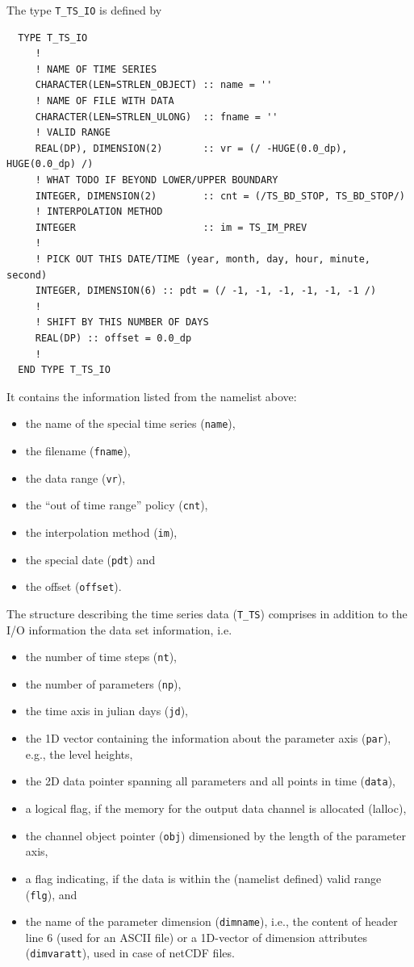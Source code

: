 \documentclass[11pt,twoside]{report}
\begin{document}
The type \verb|T_TS_IO| is defined by
\begin{verbatim}
  TYPE T_TS_IO
     !
     ! NAME OF TIME SERIES
     CHARACTER(LEN=STRLEN_OBJECT) :: name = ''
     ! NAME OF FILE WITH DATA
     CHARACTER(LEN=STRLEN_ULONG)  :: fname = ''
     ! VALID RANGE
     REAL(DP), DIMENSION(2)       :: vr = (/ -HUGE(0.0_dp), HUGE(0.0_dp) /)
     ! WHAT TODO IF BEYOND LOWER/UPPER BOUNDARY
     INTEGER, DIMENSION(2)        :: cnt = (/TS_BD_STOP, TS_BD_STOP/)
     ! INTERPOLATION METHOD
     INTEGER                      :: im = TS_IM_PREV
     !
     ! PICK OUT THIS DATE/TIME (year, month, day, hour, minute, second)
     INTEGER, DIMENSION(6) :: pdt = (/ -1, -1, -1, -1, -1, -1 /)
     !
     ! SHIFT BY THIS NUMBER OF DAYS
     REAL(DP) :: offset = 0.0_dp
     !     
  END TYPE T_TS_IO
\end{verbatim}
It contains the information listed from the namelist above: 
\begin{itemize}
\item the name of the special time series (\verb|name|), 
\item the filename (\verb|fname|), 
\item the data range (\verb|vr|), 
\item the ``out of time range'' policy (\verb|cnt|),
\item  the interpolation method (\verb|im|), 
\item the special date (\verb|pdt|) and 
\item the offset (\verb|offset|).
\end{itemize}

The structure describing the time series data (\verb|T_TS|) comprises
in addition to the I/O information the data set information, i.e. 
\begin{itemize}
\item the number of time steps (\verb|nt|), 
\item the number of parameters (\verb|np|), 
\item the time axis in julian days (\verb|jd|), 
\item the 1D vector containing the information about the parameter
axis (\verb|par|), e.g., the level heights, 
\item the 2D data pointer spanning all parameters and all points in time (\verb|data|), 
\item a logical flag, if the memory for the output data channel is allocated 
(\verb||lalloc),  
\item the channel object pointer (\verb|obj|) dimensioned by the length of the
 parameter axis,
\item a flag indicating, if the data is within the (namelist defined)
valid range (\verb|flg|), and 
\item the name of the parameter dimension (\verb|dimname|),
 i.e., the content of header line 6 (used for an ASCII file) or a 
1D-vector of dimension
 attributes (\verb|dimvaratt|), used in case of netCDF files.
\end{itemize}
\end{document}
